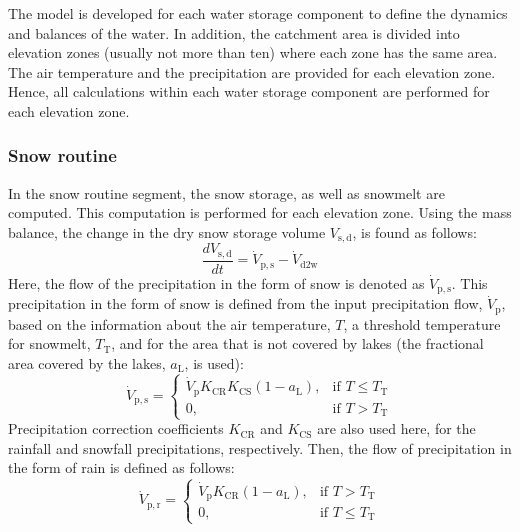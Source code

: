 \documentclass[%
]{USN-PhD}
\begin{document}
The model is developed for each water storage component to define the dynamics and balances of the water. In addition, the catchment area is divided into elevation zones (usually not more than ten) where each zone has the same area. The air temperature and the precipitation are provided for each elevation zone. Hence, all  calculations within each water storage component are performed for each elevation zone.

\subsubsection{Snow routine}

In the snow routine segment, the snow storage, as well as snowmelt are computed. This computation is performed for each elevation zone. Using the mass balance, the change in the dry snow storage volume $V_\mathrm{s,d}$, is found as follows:
\begin{equation}\label{eq:eq20}
\frac{dV_\mathrm{s,d}}{dt}=\dot{V}_\mathrm{p,s}-\dot{V}_\mathrm{d2w}
\end{equation}
Here, the flow of the precipitation in the form of snow is denoted as $\dot{V}_\mathrm{p,s}$. This precipitation in the form of snow is defined from the input precipitation flow, $\dot{V}_\mathrm{p}$, based on the information about the air temperature, $T$, a threshold temperature for snowmelt, $T_\mathrm{T}$, and for the area that is not covered by lakes (the fractional area covered by the lakes, $a_\mathrm{L}$, is used):
\begin{equation}\label{eq:eq21}
\dot{V}_\mathrm{p,s}=\begin{cases} \dot{V}_\mathrm{p}K_\mathrm{CR}K_\mathrm{CS}(1 - a_\mathrm{L}), & \mbox{if } T\leq T_\mathrm{T}\\ 0, & \mbox{if } T>T_\mathrm{T} \end{cases}
\end{equation}
Precipitation correction coefficients $K_\mathrm{CR}$ and $K_\mathrm{CS}$ are also used here, for the rainfall and snowfall precipitations, respectively. Then, the flow of precipitation in the form of rain is defined as follows:
\begin{equation}\label{eq:eq22}
\dot{V}_\mathrm{p,r}=\begin{cases} \dot{V}_\mathrm{p}K_\mathrm{CR}(1 - a_\mathrm{L}), & \mbox{if } T>T_\mathrm{T}\\ 0, & \mbox{if } T\leq T_\mathrm{T} \end{cases}
\end{equation}
\end{document}
